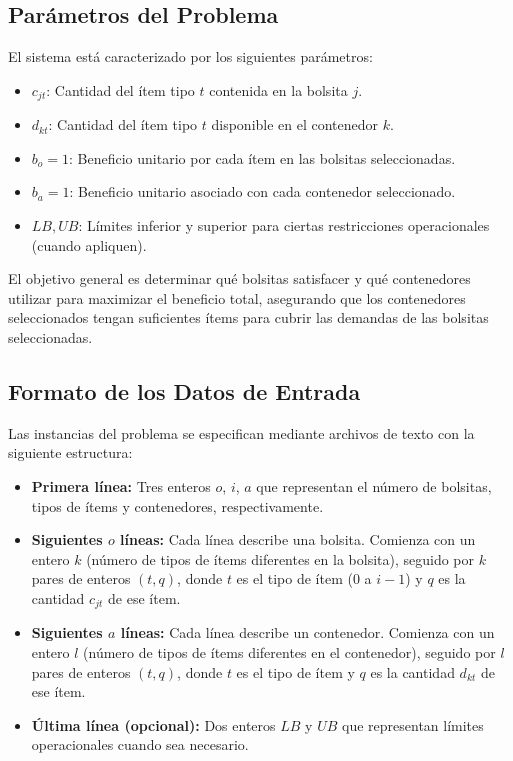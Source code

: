 \documentclass[a4paper,12pt]{article}
\begin{document}
\subsection{Parámetros del Problema}

El sistema está caracterizado por los siguientes parámetros:

\begin{itemize}
    \item $c_{jt}$: Cantidad del ítem tipo $t$ contenida en la bolsita $j$.
    \item $d_{kt}$: Cantidad del ítem tipo $t$ disponible en el contenedor $k$.
    \item $b_o = 1$: Beneficio unitario por cada ítem en las bolsitas seleccionadas.
    \item $b_a = 1$: Beneficio unitario asociado con cada contenedor seleccionado.
    \item $LB, UB$: Límites inferior y superior para ciertas restricciones operacionales (cuando apliquen).
\end{itemize}

El objetivo general es determinar qué bolsitas satisfacer y qué contenedores utilizar para maximizar el beneficio total, asegurando que los contenedores seleccionados tengan suficientes ítems para cubrir las demandas de las bolsitas seleccionadas.

\subsection{Formato de los Datos de Entrada}

Las instancias del problema se especifican mediante archivos de texto con la siguiente estructura:

\begin{itemize}
    \item \textbf{Primera línea:} Tres enteros $o$, $i$, $a$ que representan el número de bolsitas, tipos de ítems y contenedores, respectivamente.
    \item \textbf{Siguientes $o$ líneas:} Cada línea describe una bolsita. Comienza con un entero $k$ (número de tipos de ítems diferentes en la bolsita), seguido por $k$ pares de enteros $(t, q)$, donde $t$ es el tipo de ítem ($0$ a $i-1$) y $q$ es la cantidad $c_{jt}$ de ese ítem.
    \item \textbf{Siguientes $a$ líneas:} Cada línea describe un contenedor. Comienza con un entero $l$ (número de tipos de ítems diferentes en el contenedor), seguido por $l$ pares de enteros $(t, q)$, donde $t$ es el tipo de ítem y $q$ es la cantidad $d_{kt}$ de ese ítem.
    \item \textbf{Última línea (opcional):} Dos enteros $LB$ y $UB$ que representan límites operacionales cuando sea necesario.
\end{itemize}
\end{document}
